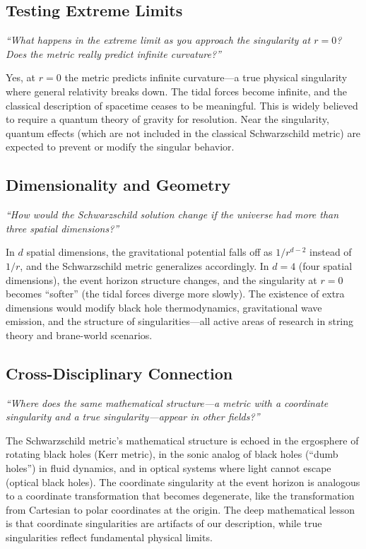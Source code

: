 \subsection*{Testing Extreme Limits}
\textit{``What happens in the extreme limit as you approach the singularity at $r = 0$? Does the metric really predict infinite curvature?''}

Yes, at $r = 0$ the metric predicts infinite curvature---a true physical singularity where general relativity breaks down. The tidal forces become infinite, and the classical description of spacetime ceases to be meaningful. This is widely believed to require a quantum theory of gravity for resolution. Near the singularity, quantum effects (which are not included in the classical Schwarzschild metric) are expected to prevent or modify the singular behavior.

\subsection*{Dimensionality and Geometry}
\textit{``How would the Schwarzschild solution change if the universe had more than three spatial dimensions?''}

In $d$ spatial dimensions, the gravitational potential falls off as $1/r^{d-2}$ instead of $1/r$, and the Schwarzschild metric generalizes accordingly. In $d = 4$ (four spatial dimensions), the event horizon structure changes, and the singularity at $r = 0$ becomes ``softer'' (the tidal forces diverge more slowly). The existence of extra dimensions would modify black hole thermodynamics, gravitational wave emission, and the structure of singularities---all active areas of research in string theory and brane-world scenarios.

\subsection*{Cross-Disciplinary Connection}
\textit{``Where does the same mathematical structure---a metric with a coordinate singularity and a true singularity---appear in other fields?''}

The Schwarzschild metric's mathematical structure is echoed in the ergosphere of rotating black holes (Kerr metric), in the sonic analog of black holes (``dumb holes'') in fluid dynamics, and in optical systems where light cannot escape (optical black holes). The coordinate singularity at the event horizon is analogous to a coordinate transformation that becomes degenerate, like the transformation from Cartesian to polar coordinates at the origin. The deep mathematical lesson is that coordinate singularities are artifacts of our description, while true singularities reflect fundamental physical limits.

